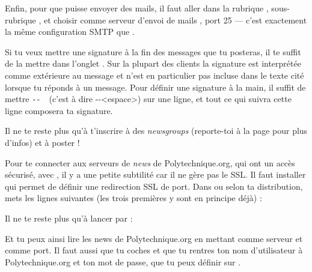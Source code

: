 Enfin, pour que  puisse envoyer des mails, il faut aller
dans la rubrique , sous-rubrique , et choisir comme serveur d'envoi de mails
, port 25 --- c'est exactement la m\^eme
configuration SMTP que .

Si tu veux mettre une signature \`a la fin des messages que tu
posteras, il te suffit de la mettre dans l'onglet .
Sur la plupart des clients la signature est interpr\'et\'ee comme
ext\'erieure au message et n'est en particulier pas incluse dans le
texte cit\'e lorsque tu r\'eponds \`a un message. Pour d\'efinir une
signature \`a la main, il suffit de mettre \verb*+-- +\ (c'est \`a dire
-{}-<espace>) sur une ligne, et tout ce qui suivra cette ligne
composera ta signature.

Il ne te reste plus qu'\`a t'inscrire \`a des \emph{newsgroups} (reporte-toi \`a la page \pageref{newsgroups} pour plus d'infos) et \`a poster !

Pour te connecter aux serveurs de \emph{news} de Polytechnique.org, qui ont un acc\`es s\'ecuris\'e, avec , il y a une petite subtilit\'e car il
ne g\`ere pas le SSL. Il faut installer  qui permet de d\'efinir une redirection SSL de port. Dans  ou
 selon ta distribution, mets les lignes suivantes (les trois premi\`eres y sont en principe d\'ej\`a) :


Il ne te reste plus qu'\`a lancer  par :


Et tu peux ainsi lire les news de Polytechnique.org en mettant  comme serveur et
 comme port. Il faut aussi que tu coches  et
que tu rentres ton nom d'utilisateur \`a Polytechnique.org et ton mot de passe, que tu peux d\'efinir
sur .
